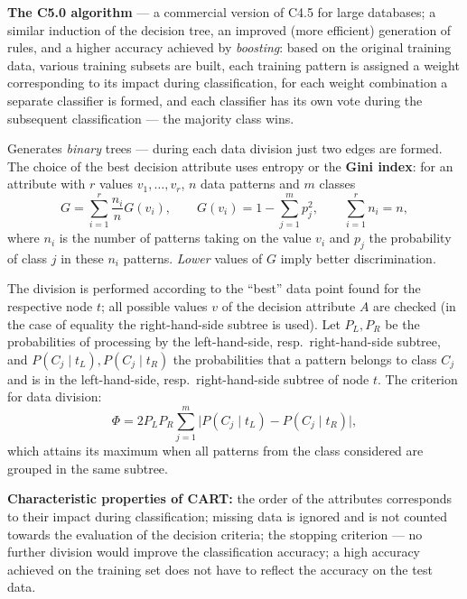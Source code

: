 \documentclass[11pt,a4paper]{article}
\theoremstyle{definition}
\providecommand{\uv}[1]{``#1''}
\begin{document}
\textbf{The C5.0 algorithm} --- a commercial version of C4.5 for large databases; a similar
induction of the decision tree, an improved (more efficient) generation of rules, and a higher
accuracy achieved by \emph{boosting}: based on the original training data, various training
subsets are built, each training pattern is assigned a weight corresponding to its impact during
classification, for each weight combination a separate classifier is formed, and each classifier
has its own vote during the subsequent classification --- the majority class wins.

\begin{defbox}
Generates \emph{binary} trees --- during each data division just two edges are formed. The choice
of the best decision attribute uses entropy or the \textbf{Gini index}: for an attribute with $r$
values $v_1,\dots,v_r$, $n$ data patterns and $m$ classes
\[ G=\sum_{i=1}^{r}\frac{n_i}{n}G(v_i),\qquad G(v_i)=1-\sum_{j=1}^{m}p_j^2,
   \qquad \sum_{i=1}^{r}n_i=n, \]
where $n_i$ is the number of patterns taking on the value $v_i$ and $p_j$ the probability of class
$j$ in these $n_i$ patterns. \emph{Lower} values of $G$ imply better discrimination.

The division is performed according to the \uv{best} data point found for the respective node
$t$; all possible values $v$ of the decision attribute $A$ are checked (in the case of equality
the right-hand-side subtree is used). Let $P_L,P_R$ be the probabilities of processing by the
left-hand-side, resp.\ right-hand-side subtree, and $P(C_j\mid t_L),P(C_j\mid t_R)$ the
probabilities that a pattern belongs to class $C_j$ and is in the left-hand-side, resp.\
right-hand-side subtree of node $t$. The criterion for data division:
\[ \Phi=2P_LP_R\sum_{j=1}^{m}\big|P(C_j\mid t_L)-P(C_j\mid t_R)\big|, \]
which attains its maximum when all patterns from the class considered are grouped in the same
subtree.

\textbf{Characteristic properties of CART:} the order of the attributes corresponds to their
impact during classification; missing data is ignored and is not counted towards the evaluation of
the decision criteria; the stopping criterion --- no further division would improve the
classification accuracy; a high accuracy achieved on the training set does not have to reflect the
accuracy on the test data.
\end{defbox}
\end{document}
